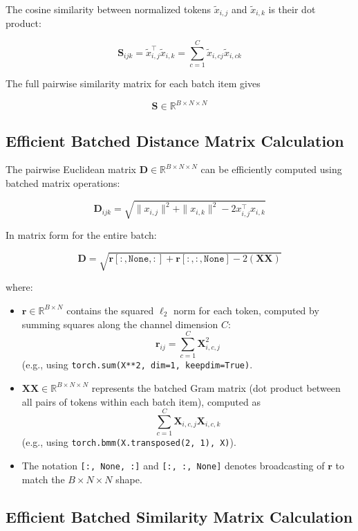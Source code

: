 \documentclass{article}
\begin{document}
The cosine similarity between normalized tokens \(\tilde{x}_{i,j}\) and \(\tilde{x}_{i,k}\) is their dot product: 

\[
    \mathbf{S}_{ijk} = \tilde{x}_{i,j}^{\top} \tilde{x}_{i,k} = \sum_{c=1}^C \tilde{x}_{i,cj} \tilde{x}_{i,ck}
\]

The full pairwise similarity matrix for each batch item gives 

\[
    \mathbf{S} \in \mathbb{R}^{B \times N \times N}
\]

\subsection*{Efficient Batched Distance Matrix Calculation}

The pairwise Euclidean matrix \(\mathbf{D} \in \mathbb{R}^{B \times N \times N}\) can be efficiently computed using batched matrix operations: 

\[
    \mathbf{D}_{ijk} = \sqrt{\|x_{i,j}\|^2 + \|x_{i,k}\|^2 - 2x_{i,j}^{\top}x_{i,k}}
\]

In matrix form for the entire batch: 

\[
    \mathbf{D} = \sqrt{\mathbf{r}[:, \texttt{None}, :] + \mathbf{r}[:, :, \texttt{None}] - 2(\mathbf{XX})}
\]

where: 

\begin{itemize}
    \item  \(\mathbf{r} \in \mathbb{R}^{B \times N}\) contains the squared \(\ell_2\) norm for each token, computed by summing squares along the channel dimension \(C\): 
    \[
        \mathbf{r}_{ij} = \sum_{c=1}^C \mathbf{X}^2_{i,c,j}
    \]
    (e.g., using \texttt{torch.sum(X**2, dim=1, keepdim=True)}.

    \item \(\mathbf{XX} \in \mathbb{R}^{B \times N \times N}\) represents the batched Gram matrix (dot product between all pairs of tokens within each batch item), computed as 
    \[
        \sum_{c=1}^C \mathbf{X}_{i,c,j} \mathbf{X}_{i,c,k}
    \]
    (e.g., using \texttt{torch.bmm(X.transposed(2, 1), X)}).

    \item The notation \texttt{[:, \texttt{None}, :]} and \texttt{[:, :, \texttt{None}]} denotes broadcasting of \(\mathbf{r}\) to match the \(B \times N \times N\) shape. 
\end{itemize}

\subsection*{Efficient Batched Similarity Matrix Calculation}
\end{document}
